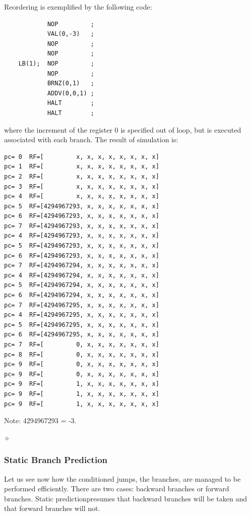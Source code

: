 \begin{exemplu}
Reordering is exemplified by the following code:
\begin{verbatim}
            NOP         ;
            VAL(0,-3)   ;
            NOP         ;
            NOP         ;
    LB(1);  NOP         ;
            NOP         ;
            BRNZ(0,1)   ;
            ADDV(0,0,1) ;
            HALT        ;
            HALT        ;
\end{verbatim}
where the increment of the register 0 is specified out of loop, but is executed associated with each branch.
The result of simulation is:
{\small
\begin{verbatim}
pc= 0  RF=[         x, x, x, x, x, x, x, x]
pc= 1  RF=[         x, x, x, x, x, x, x, x]
pc= 2  RF=[         x, x, x, x, x, x, x, x]
pc= 3  RF=[         x, x, x, x, x, x, x, x]
pc= 4  RF=[         x, x, x, x, x, x, x, x]
pc= 5  RF=[4294967293, x, x, x, x, x, x, x] 	
pc= 6  RF=[4294967293, x, x, x, x, x, x, x] 	
pc= 7  RF=[4294967293, x, x, x, x, x, x, x] 	
pc= 4  RF=[4294967293, x, x, x, x, x, x, x] 	
pc= 5  RF=[4294967293, x, x, x, x, x, x, x] 	
pc= 6  RF=[4294967293, x, x, x, x, x, x, x] 	
pc= 7  RF=[4294967294, x, x, x, x, x, x, x] 	
pc= 4  RF=[4294967294, x, x, x, x, x, x, x] 	
pc= 5  RF=[4294967294, x, x, x, x, x, x, x] 	
pc= 6  RF=[4294967294, x, x, x, x, x, x, x] 	
pc= 7  RF=[4294967295, x, x, x, x, x, x, x] 	
pc= 4  RF=[4294967295, x, x, x, x, x, x, x] 	
pc= 5  RF=[4294967295, x, x, x, x, x, x, x] 	
pc= 6  RF=[4294967295, x, x, x, x, x, x, x] 	
pc= 7  RF=[         0, x, x, x, x, x, x, x]
pc= 8  RF=[         0, x, x, x, x, x, x, x]
pc= 9  RF=[         0, x, x, x, x, x, x, x]
pc= 9  RF=[         0, x, x, x, x, x, x, x]
pc= 9  RF=[         1, x, x, x, x, x, x, x]
pc= 9  RF=[         1, x, x, x, x, x, x, x]
pc= 9  RF=[         1, x, x, x, x, x, x, x]
\end{verbatim}
}
Note: 4294967293 = -3.

$\diamond$
\end{exemplu}


\subsubsection{Static Branch Prediction}

Let us see now how the conditioned jumps, the branches, are managed to be performed efficiently. There are two cases: backward branches or forward branches. Static predictionpresumes that backward branches will be taken and that forward branches will not.


